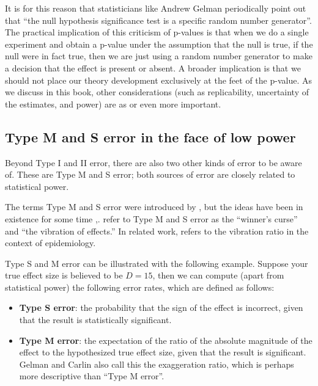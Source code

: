 \documentclass[12pt,]{krantz}
\providecommand{\tightlist}{%
  \setlength{\itemsep}{0pt}\setlength{\parskip}{0pt}}
\begin{document}
It is for this reason that statisticians like Andrew Gelman periodically point out that ``the null hypothesis significance test is a specific random number generator''. The practical implication of this criticism of p-values is that when we do a single experiment and obtain a p-value under the assumption that the null is true, if the null were in fact true, then we are just using a random number generator to make a decision that the effect is present or absent. A broader implication is that we should not place our theory development exclusively at the feet of the p-value. As we discuss in this book, other considerations (such as replicability, uncertainty of the estimates, and power) are as or even more important.

\hypertarget{type-m-and-s-error-in-the-face-of-low-power}{%
\subsection{Type M and S error in the face of low power}\label{type-m-and-s-error-in-the-face-of-low-power}}

Beyond Type I and II error, there are also two other kinds of error to be aware of. These are Type M and S error; both sources of error are closely related to statistical power.

The terms Type M and S error were introduced by \citet{Gelman14}, but the ideas have been in existence for some time \citep{hedges1984estimation},\citep{lane1978estimating}. \citet{powerfailure} refer to Type M and S error as the ``winner's curse'' and ``the vibration of effects.'' In related work, \citet{ioannidis2008most} refers to the vibration ratio in the context of epidemiology.

Type S and M error can be illustrated with the following example.
Suppose your true effect size is believed to be \(D=15\),
then we can compute (apart from statistical power) the following error rates, which are defined as follows:

\begin{itemize}
\tightlist
\item
  \textbf{Type S error}: the probability that the sign of the effect is incorrect, given that the result is statistically significant.
\item
  \textbf{Type M error}: the expectation of the ratio of the absolute magnitude of the effect to the hypothesized true effect size, given that the result is significant.
  Gelman and Carlin also call this the exaggeration ratio, which is perhaps more descriptive than ``Type M error''.
\end{itemize}
\end{document}
